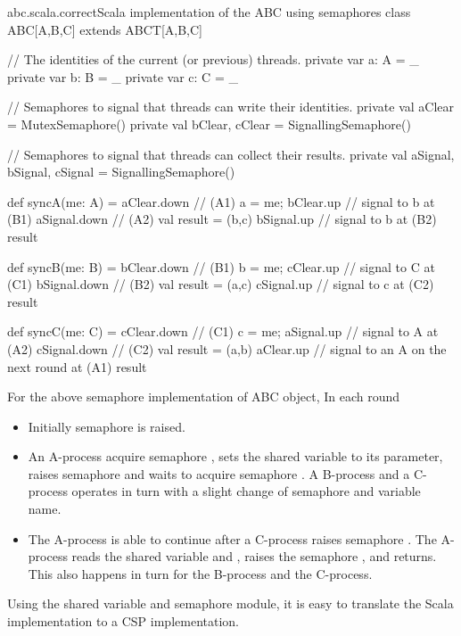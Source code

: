 \documentclass{article}
\begin{document}
\begin{scalafloat}{abc.scala.correct}{Scala implementation of the ABC using semaphores}
class ABC[A,B,C] extends ABCT[A,B,C]{
  // The identities of the current (or previous) threads.
  private var a: A = _
  private var b: B = _
  private var c: C = _

  // Semaphores to signal that threads can write their identities.
  private val aClear = MutexSemaphore()
  private val bClear, cClear = SignallingSemaphore()

  // Semaphores to signal that threads can collect their results. 
  private val aSignal, bSignal, cSignal = SignallingSemaphore()

  def syncA(me: A) = {
    aClear.down         // (A1)
    a = me; bClear.up   // signal to b at (B1)
    aSignal.down        // (A2)
    val result = (b,c)
    bSignal.up          // signal to b at (B2)
    result
  }

  def syncB(me: B) = {
    bClear.down         // (B1)
    b = me; cClear.up   // signal to C at (C1)
    bSignal.down        // (B2)
    val result = (a,c)
    cSignal.up          // signal to c at (C2)
    result
  }

  def syncC(me: C) = {
    cClear.down         // (C1)
    c = me; aSignal.up  // signal to A at (A2)
    cSignal.down        // (C2)
    val result = (a,b)
    aClear.up           // signal to an A on the next round at (A1)
    result
  }
}      
\end{scalafloat}

For the above semaphore implementation of ABC object, In each round
\begin{itemize}
    \item Initially semaphore  is raised.
    \item An A-process acquire semaphore , sets the shared variable  to its parameter, raises semaphore  and waits to acquire semaphore . A B-process and a C-process operates in turn with a slight change of semaphore and variable name.
    \item The A-process is able to continue after a C-process raises semaphore . The A-process reads the shared variable  and , raises the semaphore , and returns. This also happens in turn for the B-process and the C-process.
\end{itemize}

Using the shared variable and semaphore module, it is easy to translate the Scala implementation to a CSP implementation.
\end{document}
